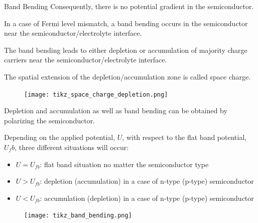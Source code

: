 \documentclass[10pt,compress,handout]{beamer}
\begin{document}
\begin{frame}[allowframebreaks=1.0]{Band Bending}
        Consequently, there is no potential gradient in the semiconductor. 
        
        In a case of Fermi level mismatch, a band bending occurs in the semiconductor 
        near the semiconductor/electrolyte interface.  
        
        \framebreak
        The band bending leads to either depletion or accumulation of majority 
        charge carriers near the semiconductor/electrolyte interface. 
        
        The spatial extension of the depletion/accumulation zone is called space 
        charge.
    
        \begin{figure}[H]
            \centering
            \texttt{[image: tikz\_space\_charge\_depletion.png]}
            \label{fig_space_charge_depletion}
        \end{figure}

        \framebreak
        
        Depletion and accumulation as well as band bending can be obtained 
        by polarizing the semiconductor.
        
        Depending on the applied potential, $U$, with respect to the flat band 
        potential, $U_fb$, three different situations will occur:
        \begin{itemize}
            \item $U = U_{fb}$: flat band situation no matter the semiconductor type
            \item $U > U_{fb}$: depletion (accumulation) in a case of n-type (p-type) semiconductor  
            \item $U < U_{fb}$: accumulation (depletion) in a case of n-type (p-type) semiconductor
        \end{itemize}
        
        \begin{figure}[H]
        \centering
            \texttt{[image: tikz\_band\_bending.png]}
            \label{fig_band_bending}
        \end{figure}
    

\end{frame}
\end{document}
